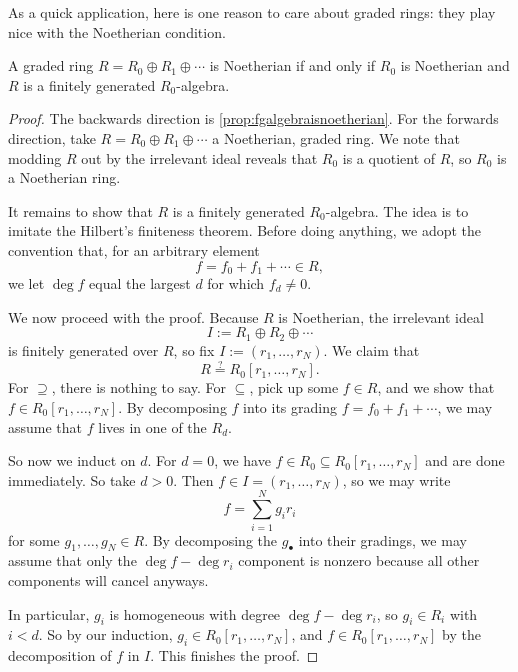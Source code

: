 \documentclass[../notes.tex]{subfiles}
\begin{document}
As a quick application, here is one reason to care about graded rings: they play nice with the Noetherian condition.
\begin{proposition}
	A graded ring $R=R_0\oplus R_1\oplus\cdots$ is Noetherian if and only if $R_0$ is Noetherian and $R$ is a finitely generated $R_0$-algebra.
\end{proposition}
\begin{proof}
	The backwards direction is \autoref{prop:fgalgebraisnoetherian}. For the forwards direction, take $R=R_0\oplus R_1\oplus\cdots$ a Noetherian, graded ring. We note that modding $R$ out by the irrelevant ideal reveals that $R_0$ is a quotient of $R$, so $R_0$ is a Noetherian ring.

	It remains to show that $R$ is a finitely generated $R_0$-algebra. The idea is to imitate the Hilbert's finiteness theorem. Before doing anything, we adopt the convention that, for an arbitrary element
	\[f=f_0+f_1+\cdots\in R,\]
	we let $\deg f$ equal the largest $d$ for which $f_d\ne0$.
	
	We now proceed with the proof. Because $R$ is Noetherian, the irrelevant ideal
	\[I:=R_1\oplus R_2\oplus\cdots\]
	is finitely generated over $R$, so fix $I:=(r_1,\ldots,r_N)$. We claim that
	\[R\stackrel?=R_0[r_1,\ldots,r_N].\]
	For $\supseteq$, there is nothing to say. For $\subseteq$, pick up some $f\in R$, and we show that $f\in R_0[r_1,\ldots,r_N]$. By decomposing $f$ into its grading $f=f_0+f_1+\cdots$, we may assume that $f$ lives in one of the $R_d$.

	So now we induct on $d$. For $d=0$, we have $f\in R_0\subseteq R_0[r_1,\ldots,r_N]$ and are done immediately. So take $d>0$. Then $f\in I=(r_1,\ldots,r_N)$, so we may write
	\[f=\sum_{i=1}^Ng_ir_i\]
	for some $g_1,\ldots,g_N\in R$. By decomposing the $g_\bullet$ into their gradings, we may assume that only the $\deg f-\deg r_i$ component is nonzero because all other components will cancel anyways.
	
	In particular, $g_i$ is homogeneous with degree $\deg f-\deg r_i$, so $g_i\in R_i$ with $i<d$. So by our induction, $g_i\in R_0[r_1,\ldots,r_N]$, and $f\in R_0[r_1,\ldots,r_N]$ by the decomposition of $f$ in $I$. This finishes the proof.
\end{proof}
\end{document}
